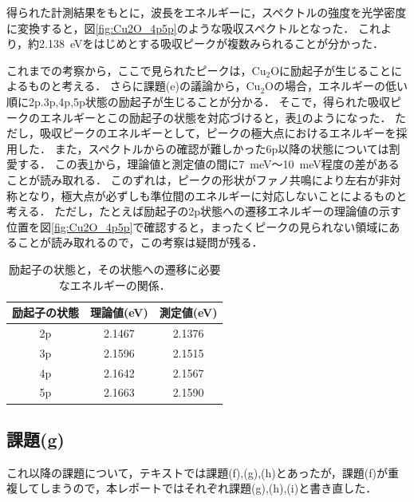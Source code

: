 \documentclass[titlepage]{jsarticle}
\begin{document}
得られた計測結果をもとに，波長をエネルギーに，スペクトルの強度を光学密度に変換すると，図\ref{fig:Cu2O_4p5p}のような吸収スペクトルとなった．
これより，約\SI{2.138}{\eV}をはじめとする吸収ピークが複数みられることが分かった．

これまでの考察から，ここで見られたピークは，Cu$_2$Oに励起子が生じることによるものと考える．
さらに課題(e)の議論から，Cu$_2$Oの場合，エネルギーの低い順に2p.3p,4p,5p状態の励起子が生じることが分かる．
そこで，得られた吸収ピークのエネルギーとこの励起子の状態を対応づけると，表\ref{tab:Cu2O_4p5p}のようになった．
ただし，吸収ピークのエネルギーとして，ピークの極大点におけるエネルギーを採用した．
また，スペクトルからの確認が難しかった6p以降の状態については割愛する．
この表\ref{tab:Cu2O_4p5p}から，理論値と測定値の間に\SI{7}{\meV}～\SI{10}{\meV}程度の差があることが読み取れる．
このずれは，ピークの形状がファノ共鳴により左右が非対称となり，極大点が必ずしも準位間のエネルギーに対応しないことによるものと考える．
ただし，たとえば励起子の2p状態への遷移エネルギーの理論値の示す位置を図\ref{fig:Cu2O_4p5p}で確認すると，まったくピークの見られない領域にあることが読み取れるので，この考察は疑問が残る．

\begin{table}[htbp]
  \centering
  \caption{励起子の状態と，その状態への遷移に必要なエネルギーの関係．}
  \label{tab:Cu2O_4p5p}
  \begin{tabular}{cc|c}
    励起子の状態 & 理論値(\si{\eV}) & 測定値(\si{\eV}) \\
    \hline\hline
    2p & 2.1467 & 2.1376 \\
    3p & 2.1596 & 2.1515 \\
    4p & 2.1642 & 2.1567 \\
    5p & 2.1663 & 2.1590 \\
    \hline
  \end{tabular}
\end{table}


\subsection{課題(g)}

これ以降の課題について，テキストでは課題(f),(g),(h)とあったが，課題(f)が重複してしまうので，本レポートではそれぞれ課題(g),(h),(i)と書き直した．
\end{document}
